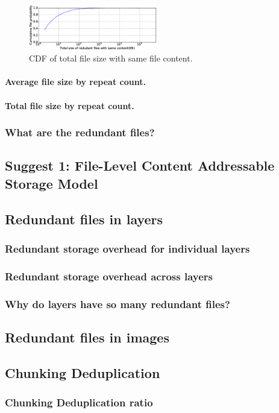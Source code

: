 \begin{figure}
	\centering
	\includegraphics[width=0.5\textwidth]{graphs/Total_size_of_redudant_files_with_same_content-KB.eps}
	\caption{CDF of total file size with same file content.
	}
	\label{fig_redundant_size}
\end{figure}

\paragraph{Average file size by repeat count.}


\paragraph{Total file size by repeat count.}


\subsubsection{What are the redundant files?}


\subsection{Suggest 1: File-Level Content Addressable Storage Model}


\subsection{Redundant files in layers}


\subsubsection{Redundant storage overhead for individual layers}


\subsubsection{Redundant storage overhead across layers}


\subsubsection{Why do layers have so many redundant files?}


\subsection{Redundant files in images}


\subsection{Chunking Deduplication}

\subsubsection{Chunking Deduplication ratio}
